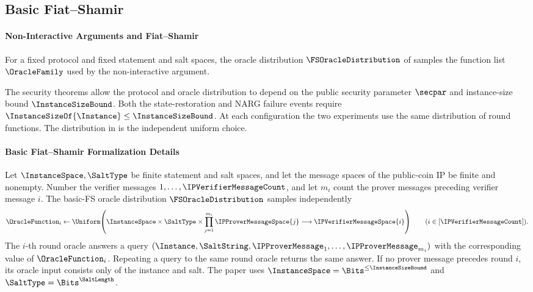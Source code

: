 \subsection{Basic Fiat--Shamir}

\paragraph{Non-Interactive Arguments and Fiat--Shamir}
\label{sec:basic_fs}

For a fixed protocol and fixed statement and salt spaces, the oracle distribution \(\FSOracleDistribution\) of  samples the function list \(\OracleFamily\) used by the non-interactive argument.

The security theorems allow the protocol and oracle distribution to depend on the public security parameter \(\secpar\) and instance-size bound \(\InstanceSizeBound\). Both the state-restoration and NARG failure events require \(\InstanceSizeOf{\Instance}\le\InstanceSizeBound\). At each configuration the two experiments use the same distribution of round functions. The distribution in  is the independent uniform choice.

\paragraph{Basic Fiat--Shamir Formalization Details}
\label{sec:basic_fs_interface}

\begin{definition}
\label{def:basic_fs_oracle_distribution}
Let \(\InstanceSpace,\SaltType\) be finite statement and salt spaces, and let the message spaces of the public-coin IP be finite and nonempty. Number the verifier messages \(1,\ldots,\IPVerifierMessageCount\), and let \(m_i\) count the prover messages preceding verifier message \(i\). The basic-FS oracle distribution \(\FSOracleDistribution\) samples independently
\begin{equation*}
  \OracleFunction_i\leftarrow\Uniform\!\left(
    \InstanceSpace\times\SaltType\times
      \prod_{j=1}^{m_i}\IPProverMessageSpace{j}
       \longrightarrow\IPVerifierMessageSpace{i}\right)
       \qquad(i\in[\IPVerifierMessageCount]).
\end{equation*}
The \(i\)-th round oracle answers a query \((\Instance,\SaltString,\IPProverMessage_1,\ldots,\IPProverMessage_{m_i})\) with the corresponding value of \(\OracleFunction_i\). Repeating a query to the same round oracle returns the same answer. If no prover message precedes round \(i\), its oracle input consists only of the instance and salt. The paper uses \(\InstanceSpace=\Bits^{\le\InstanceSizeBound}\) and \(\SaltType=\Bits^{\SaltLength}\).
\leanok
{}
\end{definition}


